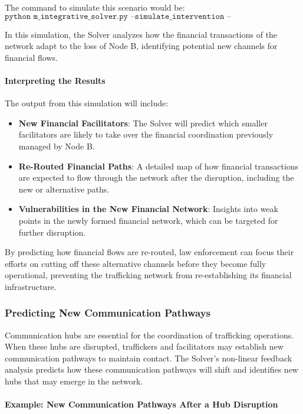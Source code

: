 \documentclass[%
 preprint, linenumbers,
 amsmath,amssymb,
 aps, physrev,
]{revtex4-2}
\begin{document}
The command to simulate this scenario would be:
\[
\texttt{python m\_integrative\_solver.py --simulate\_intervention --disrupt\_financial --node\_id 205 --predict\_adaptation}
\]

In this simulation, the Solver analyzes how the financial transactions of the network adapt to the loss of Node B, identifying potential new channels for financial flows.

\paragraph{Interpreting the Results}

The output from this simulation will include:
\begin{itemize}
    \item \textbf{New Financial Facilitators}: The Solver will predict which smaller facilitators are likely to take over the financial coordination previously managed by Node B.
    \item \textbf{Re-Routed Financial Paths}: A detailed map of how financial transactions are expected to flow through the network after the disruption, including the new or alternative paths.
    \item \textbf{Vulnerabilities in the New Financial Network}: Insights into weak points in the newly formed financial network, which can be targeted for further disruption.
\end{itemize}

By predicting how financial flows are re-routed, law enforcement can focus their efforts on cutting off these alternative channels before they become fully operational, preventing the trafficking network from re-establishing its financial infrastructure.

\subsubsection{Predicting New Communication Pathways}

Communication hubs are essential for the coordination of trafficking operations. When these hubs are disrupted, traffickers and facilitators may establish new communication pathways to maintain contact. The Solver’s non-linear feedback analysis predicts how these communication pathways will shift and identifies new hubs that may emerge in the network.

\paragraph{Example: New Communication Pathways After a Hub Disruption}
\end{document}
